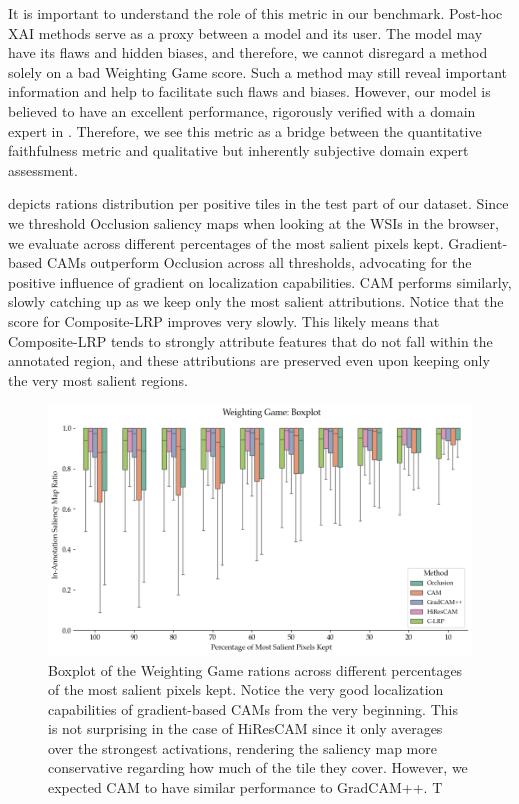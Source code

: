 It is important to understand the role of this metric in our benchmark.
Post-hoc XAI methods serve as a proxy between a model and its user.
The model may have its flaws and hidden biases, and therefore, we cannot disregard a method solely on a bad Weighting Game score.
Such a method may still reveal important information and help to facilitate such flaws and biases.
However, our model is believed to have an excellent performance, rigorously verified with a domain expert in \cite{gallo}.
Therefore, we see this metric as a bridge between the quantitative faithfulness metric and qualitative but inherently subjective domain expert assessment.

 depicts rations distribution per positive tiles in the test part of our dataset.
Since we threshold Occlusion saliency maps when looking at the WSIs in the browser, we evaluate across different percentages of the most salient pixels kept.
Gradient-based CAMs outperform Occlusion across all thresholds, advocating for the positive influence of gradient on localization capabilities.
CAM performs similarly, slowly catching up as we keep only the most salient attributions.
Notice that the score for Composite-LRP improves very slowly.
This likely means that Composite-LRP tends to strongly attribute features that do not fall within the annotated region, and these attributions are preserved even upon keeping only the very most salient regions.


\begin{figure}
    \begin{center}
    \begin{minipage}{1\textwidth}
      \includegraphics[width=\textwidth]{img/weighting-game-boxplot.png}
    \end{minipage}
    \caption{Boxplot of the Weighting Game rations across different percentages of the most salient pixels kept. Notice the very good localization capabilities of gradient-based CAMs from the very beginning. This is not surprising in the case of HiResCAM since it only averages over the strongest activations, rendering the saliency map more conservative regarding how much of the tile they cover. However, we expected CAM to have similar performance to GradCAM++. T}
    \label{fig:weighting-game-boxplot}
    \end{center}
\end{figure}


